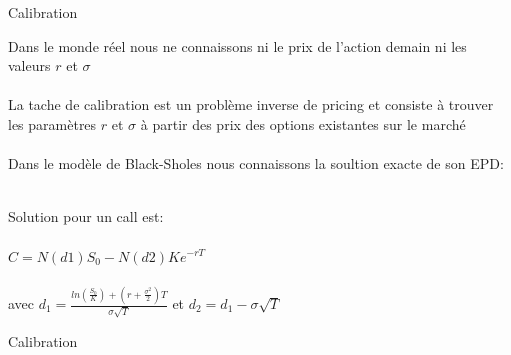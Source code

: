 \documentclass[10pt]{beamer}
\begin{document}
\begin{frame}{Calibration}{}
  
Dans le monde réel nous ne connaissons ni le prix de l'action demain ni les valeurs $r$ et $\sigma $ \\~\\

La tache de calibration est un problème inverse de pricing et consiste à trouver les paramètres $r$ et $\sigma $ à partir des prix des options existantes sur le marché \\~\\

Dans le modèle de Black-Sholes nous connaissons la soultion exacte de son EPD:\\~\\

 \begin{figure}[t]
\centering


\end{figure}

Solution pour un call est: \\~\\
$C = N(d1)S_0 - N(d2)Ke^{-rT}$ \\~\\ avec $d_1 = \frac{ln(\frac{S_0}{K})+(r+\frac{\sigma ^ {2}}{2})T}{\sigma \sqrt{T}}$ et $d_2 = d_1 - \sigma \sqrt{T}$

\end{frame}

\begin{frame}{Calibration}{}

 \begin{figure}[t]
\centering


\end{figure}

\end{frame}
\end{document}
